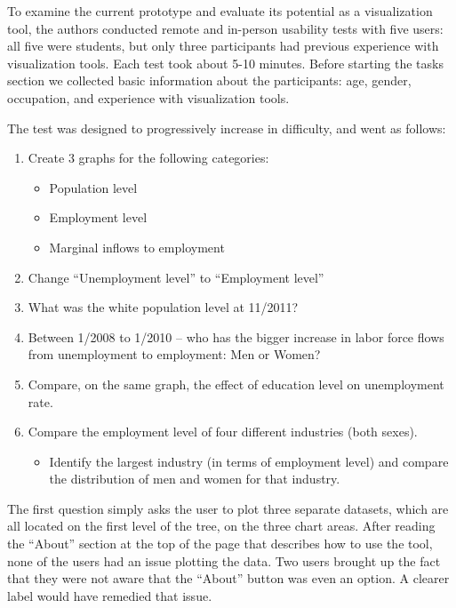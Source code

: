 \documentclass[journal]{IEEEtran}
\newcommand\Peter[1]{{\color{red}#1}}	%
\begin{document}
\Peter{To examine the current prototype and evaluate its potential as a visualization tool, the authors conducted remote and in-person usability tests with five users: all five were students, but only three participants had previous experience with visualization tools. Each test took about 5-10 minutes. Before starting the tasks section we collected basic information about the participants: age, gender, occupation, and experience with visualization tools.

The test was designed to progressively increase in difficulty, and went as follows:

\begin{enumerate}
  \item Create 3 graphs for the following categories:

\begin{itemize}
  \item Population level
  \item Employment level
  \item Marginal inflows to employment
\end{itemize}

  \item Change ``Unemployment level'' to ``Employment level''
  \item What was the white population level at 11/2011?
  \item Between 1/2008 to 1/2010 – who has the bigger increase in labor force flows from unemployment to employment: Men or Women?
  \item Compare, on the same graph, the effect of education level on unemployment rate. 
  \item Compare the employment level of four different industries (both sexes).
\begin{itemize}
  \item Identify the largest industry (in terms of employment level) and compare the distribution of men and women for that industry. 
\end{itemize}

\end{enumerate}

The first question simply asks the user to plot three separate datasets, which are all located on the first level of the tree, on the three chart areas. After reading the ``About'' section at the top of the page that describes how to use the tool, none of the users had an issue plotting the data. Two users brought up the fact that they were not aware that the ``About'' button was even an option. A clearer label would have remedied that issue. 

}
\end{document}
